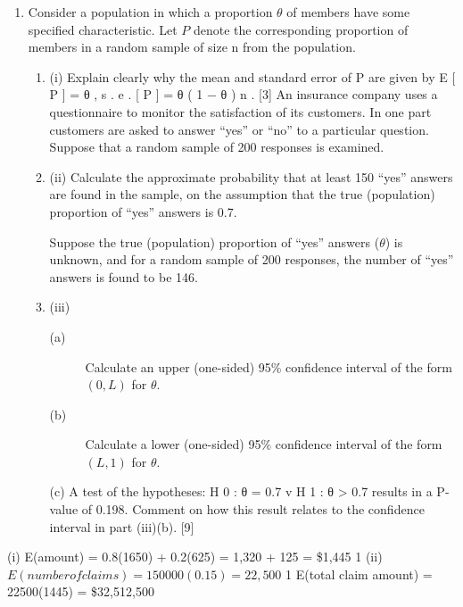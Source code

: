 \documentclass[a4paper,12pt]{article}
\begin{document}
\begin{enumerate}

\item Consider a population in which a proportion $\theta$ of members have some specified characteristic. Let $P$ denote the corresponding proportion of members in a random sample of size n from the population.
\begin{enumerate}
\item (i)
Explain clearly why the mean and standard error of P are given by
E [ P ] = θ ,
s . e . [ P ] =
θ ( 1 − θ )
n
.
[3]
An insurance company uses a questionnaire to monitor the satisfaction of its customers.
In one part customers are asked to answer “yes” or “no” to a particular question.
Suppose that a random sample of 200 responses is examined.
\item (ii)
Calculate the approximate probability that at least 150 “yes” answers are found in the sample, on the assumption that the true (population) proportion of “yes” answers is 0.7.

Suppose the true (population) proportion of “yes” answers ($\theta$) is unknown, and for a random sample of 200 responses, the number of “yes” answers is found to be 146.
\item (iii)
\begin{description}
\item[(a)] Calculate an upper (one-sided) 95\% confidence interval of the form $(0, L)$ for $\theta$.
\item[(b)] Calculate a lower (one-sided) 95\% confidence interval of the form $(L, 1)$ for $\theta$.
\end{description}

(c) A test of the hypotheses:
H 0 : θ = 0.7 v H 1 : θ > 0.7
results in a P-value of 0.198.
Comment on how this result relates to the confidence interval in part
(iii)(b).
[9]
\end{enumerate}
\end{enumerate}
(i) E(amount) = 0.8(1650) + 0.2(625) = 1,320 + 125 = \$1,445 1
(ii) $E(number of claims) = 150000(0.15) = 22,500$ 1
E(total claim amount) = 22500(1445) = \$32,512,500
\end{document}

